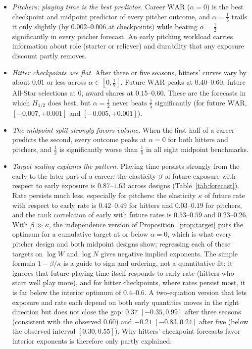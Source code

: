 \documentclass[11pt,letterpaper]{article}
\theoremstyle{plain}
\theoremstyle{definition}
\theoremstyle{remark}
\newcommand{\WAR}{\mathrm{WAR}}
\begin{document}
\begin{itemize}
    \item \emph{Pitchers: playing time is the best predictor.} Career $\WAR$ ($\alpha = 0$) is the best checkpoint and midpoint predictor of every pitcher outcome, and $\alpha = \tfrac15$ trails it only slightly (by $0.002$--$0.006$ at checkpoints) while beating $\alpha = \tfrac12$ significantly in every pitcher forecast. An early pitching workload carries information about role (starter or reliever) and durability that any exposure discount partly removes.
    \item \emph{Hitter checkpoints are flat.} After three or five seasons, hitters' curves vary by about $0.01$ or less across $\alpha \in [0, \tfrac12]$. Future $\WAR$ peaks at $0.40$--$0.60$, future All-Star selections at $0$, award shares at $0.15$--$0.60$. These are the forecasts in which $H_{1/2}$ does best, but $\alpha = \tfrac12$ never beats $\tfrac15$ significantly (for future $\WAR$, $[-0.007, +0.001]$ and $[-0.005, +0.001]$).
    \item \emph{The midpoint split strongly favors volume.} When the first half of a career predicts the second, every outcome peaks at $\alpha = 0$ for both hitters and pitchers, and $\tfrac12$ is significantly worse than $\tfrac15$ in all eight midpoint benchmarks.
    \item \emph{Target scaling explains the pattern.} Playing time persists strongly from the early to the later part of a career: the elasticity $\beta$ of future exposure with respect to early exposure is $0.87$--$1.63$ across designs (Table~\ref{tab:forecast}). Rate persists much less, especially for pitchers: the elasticity $\kappa$ of future rate with respect to early rate is $0.42$--$0.49$ for hitters and $0.03$--$0.19$ for pitchers, and the rank correlation of early with future rates is $0.53$--$0.59$ and $0.23$--$0.26$. With $\beta \gg \kappa$, the independence version of Proposition~\ref{prop:target} puts the optimum for a cumulative target at or below $\alpha = 0$, which is what every pitcher design and both midpoint designs show; regressing each of these targets on $\log W$ and $\log N$ gives negative implied exponents. The simple formula $1 - \beta/\kappa$ is a guide to sign and ordering, not a quantitative fit: it ignores that future playing time itself responds to early rate (hitters who start well play more), and for hitter checkpoints, where rates persist most, it is far below the interior optimum of $0.4$--$0.6$. A two-equation version that lets exposure and rate each depend on both early quantities moves in the right direction but does not close the gap: $0.37$ $[-0.35, 0.99]$ after three seasons (consistent with the observed $0.60$) and $-0.21$ $[-0.83, 0.24]$ after five (below the observed interval $[0.30, 0.55]$). Why hitters' checkpoint forecasts favor interior exponents is therefore only partly explained.

\end{itemize}
\end{document}

